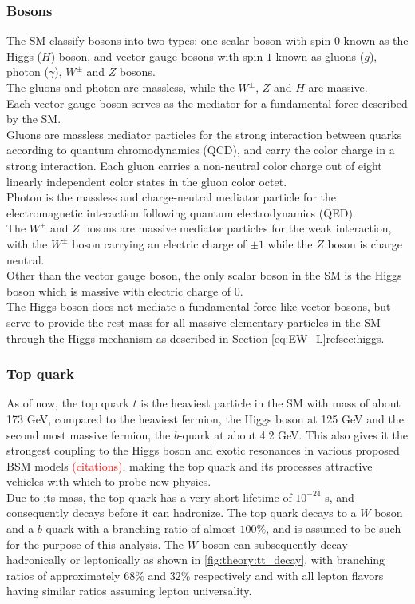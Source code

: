 \documentclass[../thesis.tex]{subfiles}
\begin{document}
\subsubsection*{Bosons}
The \acs{SM} classify bosons into two types: one scalar boson with spin $0$ known as the Higgs ($H$) boson, and vector gauge bosons with spin $1$ known as gluons ($g$), photon ($\gamma$), $W^\pm$ and $Z$ bosons.\\
The gluons and photon are massless, while the $W^\pm$, $Z$ and $H$ are massive.\\
Each vector gauge boson serves as the mediator for a fundamental force described by the SM.\\
Gluons are massless mediator particles for the strong interaction between quarks according to quantum chromodynamics (\acs{QCD}), and carry the color charge in a strong interaction. Each gluon carries a non-neutral color charge out of eight linearly independent color states in the gluon color octet.\\
Photon is the massless and charge-neutral mediator particle for the electromagnetic interaction following quantum electrodynamics (\acs{QED}).\\
The $W^\pm$ and $Z$ bosons are massive mediator particles for the weak interaction, with the $W^\pm$ boson carrying an electric charge of $\pm 1$ while the $Z$ boson is charge neutral.\\
Other than the vector gauge boson, the only scalar boson in the SM is the Higgs boson which is massive with electric charge of $0$.\\
The Higgs boson does not mediate a fundamental force like vector bosons, but serve to provide the rest mass for all massive elementary particles in the SM through the Higgs mechanism as described in Section \ref{eq:EW_L}ref{sec:higgs}.

\subsubsection*{Top quark}
\label{sec:top}
As of now, the top quark $t$ is the heaviest particle in the \acs{SM} with mass of about 173 GeV, compared to the heaviest fermion, the Higgs boson at 125 GeV and the second most massive fermion, the $b$-quark at about 4.2 GeV. This also gives it the strongest coupling to the Higgs boson and exotic resonances in various proposed \acs{BSM} models \textcolor{red}{(citations)}, making the top quark and its processes attractive vehicles with which to probe new physics.\\
Due to its mass, the top quark has a very short lifetime of $10^{-24}$ s, and consequently decays before it can hadronize. The top quark decays to a $W$ boson and a $b$-quark with a branching ratio of almost $100\%$, and is assumed to be such for the purpose of this analysis. The $W$ boson can subsequently decay hadronically or leptonically as shown in \autoref{fig:theory:tt_decay}, with branching ratios of approximately $68\%$ and $32\%$ respectively and with all lepton flavors having similar ratios assuming lepton universality.
\end{document}
